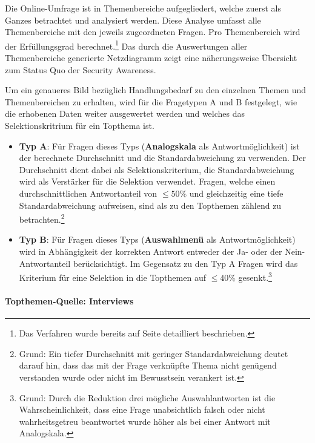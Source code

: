 \documentclass[../../main.tex]{subfiles}
\begin{document}
\begin{sloppypar}
Die Online-Umfrage ist in Themenbereiche aufgegliedert, welche zuerst als Ganzes betrachtet und analysiert werden. Diese Analyse umfasst alle Themenbereiche mit den jeweils zugeordneten Fragen.  Pro Themenbereich wird der Erfüllungsgrad berechnet.\footnote{Das Verfahren wurde bereits auf Seite \pageref{Beispielberechnung Themenabdeckung} detailliert beschrieben.} Das durch die Auswertungen aller Themenbereiche generierte Netzdiagramm zeigt eine näherungsweise Übersicht zum Status Quo der Security Awareness.

Um ein genaueres Bild bezüglich Handlungsbedarf zu den einzelnen Themen und Themenbereichen zu erhalten, wird für die Fragetypen A und B festgelegt, wie die erhobenen Daten weiter ausgewertet werden und welches das Selektionskritrium für ein Topthema ist.

\begin{itemize}

\item{\textbf{Typ A}: Für Fragen dieses Typs (\textbf{Analogskala} als Antwortmöglichkeit) ist der berechnete Durchschnitt und die Standardabweichung zu verwenden. Der Durchschnitt dient dabei als Selektionskriterium, die Standardabweichung wird als Verstärker für die Selektion verwendet. Fragen, welche einen durchschnittlichen Antwortanteil von $\le  50\%$ und gleichzeitig eine tiefe Standardabweichung aufweisen, sind als zu den Topthemen zählend zu betrachten.\footnote{Grund: Ein tiefer Durchschnitt mit geringer Standardabweichung deutet darauf hin, dass das mit der Frage verknüpfte Thema nicht genügend verstanden wurde oder nicht im Bewusstsein verankert ist.} }

\item{\textbf{Typ B}: Für Fragen dieses Typs (\textbf{Auswahlmenü} als Antwortmöglichkeit) wird in Abhängigkeit der korrekten Antwort entweder der Ja- oder der Nein-Antwortanteil berücksichtigt. Im Gegensatz zu den Typ A Fragen wird das Kriterium für eine Selektion in die Topthemen auf $\le 40\%$ gesenkt.\footnote{Grund: Durch die Reduktion drei mögliche Auswahlantworten ist die Wahrscheinlichkeit, dass eine Frage unabsichtlich falsch oder nicht wahrheitsgetreu beantwortet wurde höher als bei einer Antwort mit Analogskala.} }

\end{itemize}

\end{sloppypar}

\paragraph*{Topthemen-Quelle: Interviews}\mbox{}
\end{document}
